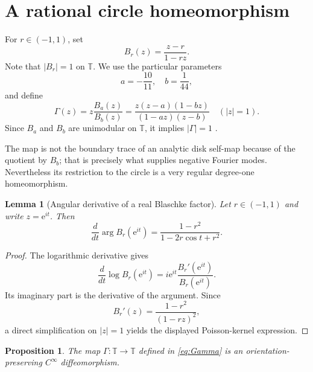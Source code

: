 \documentclass[11pt,reqno]{amsart}
\numberwithin{equation}{section}
\newtheorem{proposition}[theorem]{Proposition}
\newtheorem{lemma}[theorem]{Lemma}
\theoremstyle{definition}
\theoremstyle{remark}
\newcommand{\T}{\mathbb T}
\newcommand{\e}{\mathrm e}
\begin{document}
\section{A rational circle homeomorphism}\label{sec:boundary}

For $r\in(-1,1)$, set
\begin{equation}\label{eq:Blaschke}
 B_r(z)=\frac{z-r}{1-rz}.
\end{equation}
Note that $|B_r|=1$ on $\T$.  We use the particular parameters
\begin{equation}\label{eq:ab}
 a=-\frac{10}{11},\quad b=\frac1{44},
\end{equation}
and define
\begin{equation}\label{eq:Gamma}
 \Gamma(z)=z\frac{B_a(z)}{B_b(z)}
 =\frac{z(z-a)(1-bz)}{(1-az)(z-b)}
 \quad (|z|=1).
\end{equation}
Since $B_a$ and $B_b$ are unimodular on $\T$, it implies $|\Gamma|=1$ .

The map is not the boundary trace of an analytic disk self-map because of the quotient by $B_b$; that is precisely what supplies negative Fourier modes.  Nevertheless its restriction to the circle is a very regular degree-one homeomorphism.

\begin{lemma}[Angular derivative of a real Blaschke factor]\label{lem:angular-Blaschke}
Let $r\in(-1,1)$ and write $z=\e^{it}$.  Then
\[
 \frac{d}{dt}\arg B_r(\e^{it})
 =\frac{1-r^2}{1-2r\cos t+r^2}.
\]
\end{lemma}

\begin{proof}
The logarithmic derivative gives
\[
 \frac{d}{dt}\log B_r(\e^{it})
 = i\e^{it}\frac{B_r'(\e^{it})}{B_r(\e^{it})}.
\]
Its imaginary part is the derivative of the argument.  Since
\[
 B_r'(z)=\frac{1-r^2}{(1-rz)^2},
\]
a direct simplification on $|z|=1$ yields the displayed Poisson-kernel expression.
\end{proof}

\begin{proposition}\label{prop:Gamma-homeo}
The map $\Gamma:\T\to\T$ defined in \eqref{eq:Gamma} is an orientation-preserving $C^\infty$ diffeomorphism.
\end{proposition}
\end{document}
